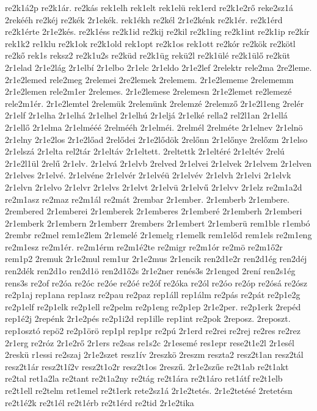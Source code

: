 {re2k1á2p
re2k1ár.
re2kás
rek1elh
rek1elt
rek1elü
rek1erd
re2k1e2rő
reke2sz1á
2rekééh
re2kéj
re2kék
2r1ekék.
rek1ékh
re2kél
2r1e2kénk
re2k1ér.
re2k1érd
re2k1érte
2r1e2kés.
re2k1éss
re2k1id
re2kij
re2kil
re2k1ing
re2k1int
re2k1ip
re2kír
rek1k2
re1klu
re2k1ok
re2k1old
rek1opt
re2k1os
rek1ott
re2kór
re2kök
re2kötl
re2kő
rek1s
reksz2
re2k1u2s
re2küd
re2k1üg
rekü2l
re2k1ülé
re2k1ülő
re2küt
2r1elad
2r1e2lág
2r1elbí
2r1elbo
2r1elc
2r1eldo
2r1e2lef
2relektr
rele2ma
2re2leme.
2r1e2lemed
rele2meg
2relemei
2re2lemek
2relemem.
2r1e2lememe
2relememm
2r1e2lemen
rele2m1er
2relemes.
2r1e2lemese
2relemesn
2r1e2lemet
re2lemezé
rele2m1ér.
2r1e2lemtel
2relemük
2relemünk
2relemzé
2relemző
2r1e2l1eng
2relér
2r1elf
2r1elha
2r1elhá
2r1elhel
2r1elhú
2r1eljá
2r1elké
rella2
rel2l1an
2r1ellá
2r1ellő
2r1elma
2r1elmééé
2relmééh
2r1elméi.
2relmél
2relméte
2r1elnev
2r1elnö
2r1elny
2r1e2los
2r1e2lőad
2relődei
2r1e2lődök
2relőnn
2r1előnye
2relőzm
2r1elso
2r1elszá
2r1elta
rel2tár
2r1eltáv
2r1eltett.
2reltettk
2r1eltéré
2r1eltév
2relú
2r1e2l1ül
2relű
2r1elv.
2r1elvá
2r1elvb
2relved
2r1elvei
2r1elvek
2r1elvem
2r1elven
2r1elves
2r1elvé.
2r1elvéne
2r1elvér
2r1elvéü
2r1elvév
2r1elvh
2r1elvi
2r1elvk
2r1elvn
2r1elvo
2r1elvr
2r1elvs
2r1elvt
2r1elvü
2r1elvű
2r1elvv
2r1elz
re2m1a2d
re2m1asz
re2maz
re2m1ál
re2mát
2rembar
2r1ember.
2r1emberb
2r1embere.
2rembered
2r1emberei
2r1emberek
2r1emberes
2r1emberé
2r1emberh
2r1emberi
2r1emberk
2r1embern
2r1emberr
2rembers
2r1embert
2r1emberü
rem1ble
r1embó
2rembr
re2mel
rem1e2lem
2r1emelé
2r1emelg
r1emelk
rem1előd
rem1els
re2m1eng
re2m1esz
re2m1ér.
re2m1érm
re2m1é2te
re2migr
re2m1ór
re2mö
re2m1ő2r
rem1p2
2remuk
2r1e2mul
rem1ur
2r1e2mus
2r1encik
ren2d1e2r
ren2d1ég
ren2déj
ren2dék
ren2d1o
ren2d1ö
ren2d1ő2s
2r1e2ner
renés3s
2r1enged
2rení
ren2s1ég
rens3s
re2of
re2óa
re2óc
re2óe
re2óé
re2óf
re2óka
re2ól
re2óo
re2óp
re2ósá
re2ósz
re2p1aj
rep1ana
rep1asz
re2pau
re2paz
rep1áll
rep1álm
re2pás
re2pát
re2p1e2g
re2p1elf
re2p1elk
re2p1ell
re2pelm
re2p1eng
re2p1ep
2r1e2per.
re2p1erk
2repéd
rep1é2j
2repénk
2r1e2pés
re2p1i2d
rep1ille
rep1int
re2pok
2reposz.
2reposzt.
rep1osztó
repö2
re2p1örö
rep1pl
rep1pr
re2pú
2r1erd
re2rei
re2rej
re2res
re2rez
2r1erg
re2róz
2r1e2rő
2r1ers
re2sas
re1s2c
2r1esemé
res1epr
rese2t1e2l
2r1esél
2reskü
r1essi
re2szaj
2r1e2szet
resz1ív
2reszkö
2reszm
reszta2
resz2t1an
resz2tál
resz2t1ár
resz2t1í2v
resz2t1o2r
resz2t1os
2reszű.
2r1e2szűe
re2t1ab
re2t1akt
re2tal
ret1a2la
re2tant
re2t1a2ny
re2tág
re2t1ára
re2t1áro
ret1átf
re2t1elb
re2t1ell
re2telm
ret1emel
re2t1erk
rete2sz1á
2r1e2tetés.
2r1e2tetésé
2retetésn
re2t1é2k
re2t1él
re2t1érb
re2t1érd
re2tid
2r1e2tika
}
